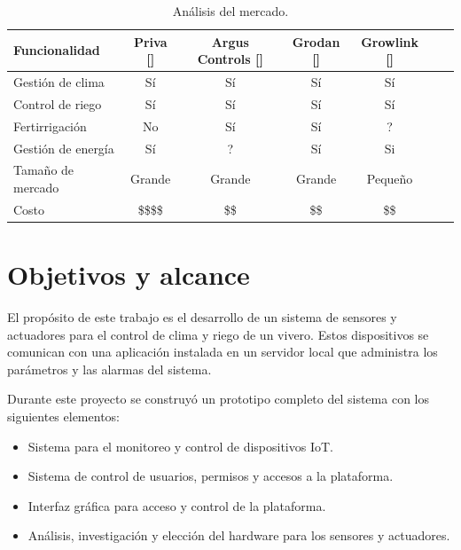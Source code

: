 \begin{table}[h]
\centering
\caption[Análisis del estado del arte]{Análisis del mercado.}

\begin{tabular}{lcccccc} 
\toprule
\textbf{Funcionalidad} & \textbf{Priva []}  & \textbf{Argus Controls []} &\textbf{Grodan []} & \textbf{Growlink []}\\

\midrule
Gestión de clima   & Sí & Sí & Sí & Sí \\
Control de riego   & Sí & Sí & Sí & Sí \\
Fertirrigación     & No & Sí & Sí & ? \\
Gestión de energía & Sí & ? & Sí & Si \\
Tamaño de mercado  & Grande &  Grande & Grande & Pequeño \\
Costo              & \$\$\$\$ &  \$\$ & \$\$ &  \$\$ \\
\bottomrule
\hline
\end{tabular}
\label{tab:vendors}
\end{table}


\section{Objetivos y alcance}


El propósito de este trabajo es el desarrollo de un sistema de sensores y actuadores para el control de clima y riego de un vivero. Estos dispositivos se comunican con una aplicación instalada en un servidor local que administra los parámetros y las alarmas del sistema.

Durante este proyecto se construyó un prototipo completo del sistema con los siguientes elementos:
 
\begin{itemize}
	\item Sistema para el monitoreo y control de dispositivos IoT.
	\item Sistema de control de usuarios, permisos y accesos a la plataforma.
	\item Interfaz gráfica para acceso y control de la plataforma.
	\item Análisis, investigación y elección del hardware para los sensores y actuadores.


\end{itemize}



